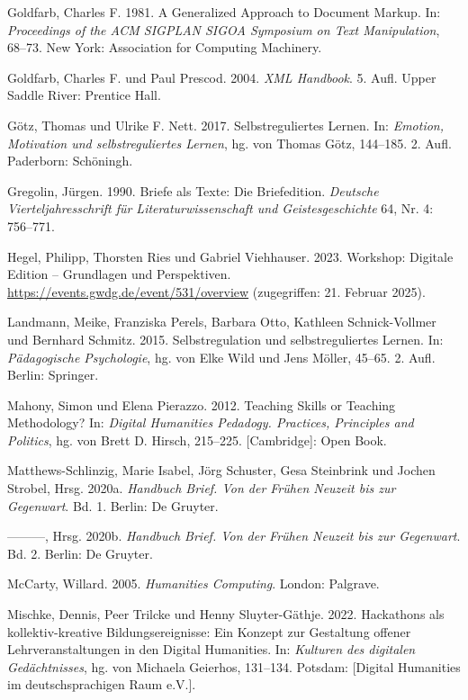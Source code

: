 \documentclass[
          a4paper,
        ]{article}
\newlength{\cslhangindent}
\newenvironment{CSLReferences}[2] %
 {\begin{list}{}{%
  \setlength{\itemindent}{0pt}
  \setlength{\leftmargin}{0pt}
  \setlength{\parsep}{0pt}
  \ifodd #1
   \setlength{\leftmargin}{\cslhangindent}
   \setlength{\itemindent}{-1\cslhangindent}
  \fi
  \setlength{\itemsep}{#2\baselineskip}}}
 {\end{list}}
\begin{document}
\begin{CSLReferences}{1}{0}
Goldfarb, Charles F. 1981. A Generalized Approach to Document Markup.
In: \emph{Proceedings of the ACM SIGPLAN SIGOA Symposium on Text
Manipulation}, 68--73. New York: Association for Computing Machinery.

Goldfarb, Charles F. und Paul Prescod. 2004. \emph{XML Handbook}. 5.
Aufl. Upper Saddle River: Prentice Hall.

Götz, Thomas und Ulrike F. Nett. 2017. Selbstreguliertes Lernen. In:
\emph{Emotion, Motivation und selbstreguliertes Lernen}, hg. von Thomas
Götz, 144--185. 2. Aufl. Paderborn: Schöningh.

Gregolin, Jürgen. 1990. Briefe als Texte: Die Briefedition.
\emph{Deutsche Vierteljahresschrift für Literaturwissenschaft und
Geistesgeschichte} 64, Nr. 4: 756--771.

Hegel, Philipp, Thorsten Ries und Gabriel Viehhauser. 2023. Workshop:
Digitale Edition -- Grundlagen und Perspektiven.
\url{https://events.gwdg.de/event/531/overview} (zugegriffen: 21.
Februar 2025).

Landmann, Meike, Franziska Perels, Barbara Otto, Kathleen
Schnick-Vollmer und Bernhard Schmitz. 2015. Selbstregulation und
selbstreguliertes Lernen. In: \emph{Pädagogische Psychologie}, hg. von
Elke Wild und Jens Möller, 45--65. 2. Aufl. Berlin: Springer.

Mahony, Simon und Elena Pierazzo. 2012. Teaching Skills or Teaching
Methodology? In: \emph{Digital Humanities Pedadogy. Practices,
Principles and Politics}, hg. von Brett D. Hirsch, 215--225.
{[}Cambridge{]}: Open Book.

Matthews-Schlinzig, Marie Isabel, Jörg Schuster, Gesa Steinbrink und
Jochen Strobel, Hrsg. 2020a. \emph{Handbuch Brief. Von der Frühen
Neuzeit bis zur Gegenwart}. Bd. 1. Berlin: De Gruyter.

---------, Hrsg. 2020b. \emph{Handbuch Brief. Von der Frühen Neuzeit bis
zur Gegenwart}. Bd. 2. Berlin: De Gruyter.

McCarty, Willard. 2005. \emph{Humanities Computing}. London: Palgrave.

Mischke, Dennis, Peer Trilcke und Henny Sluyter-Gäthje. 2022. Hackathons
als kollektiv-kreative Bildungsereignisse: Ein Konzept zur Gestaltung
offener Lehrveranstaltungen in den Digital Humanities. In:
\emph{Kulturen des digitalen Gedächtnisses}, hg. von Michaela Geierhos,
131--134. Potsdam: {[}Digital Humanities im deutschsprachigen Raum
e.V.{]}.


\end{CSLReferences}
\end{document}
